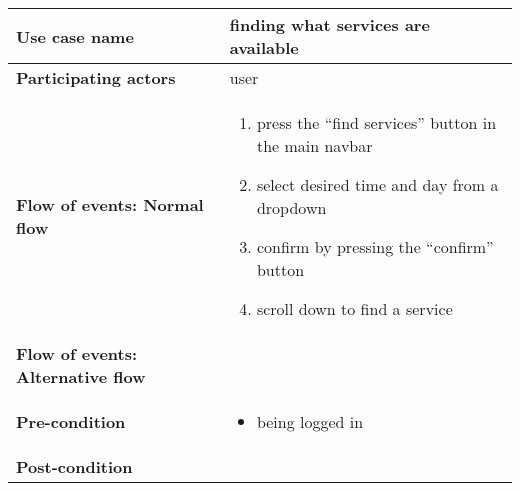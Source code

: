 \documentclass[a4paper, 13pt, draft]{report}
\begin{document}
\begin{center}
    \begin{tabular}{| >{\bf}l | p{5.55cm} |} 
	\hline
	Use case name & finding what services are available \\ 
	\hline
	Participating actors & user \\
	\hline
	Flow of events: Normal flow & 
	\begin{enumerate}		
	    \item press the ``find services'' button in the main navbar
	    \item select desired time and day from a dropdown
	    \item confirm by pressing the ``confirm'' button
	    \item scroll down to find a service
	\end{enumerate}	\\
	\hline
	Flow of events: Alternative flow & \notapplicable \\
	\hline
	Pre-condition & 
	\begin{itemize} 
	    \item being logged in
	\end{itemize} \\
	\hline
	Post-condition & \notapplicable \\
	\hline
    \end{tabular}
\end{center}
\end{document}
